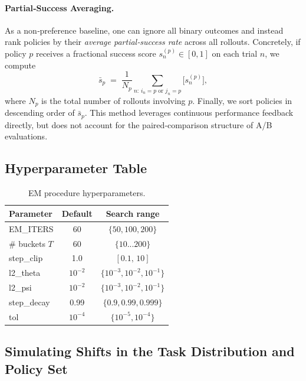 \paragraph{Partial‐Success Averaging.}  
As a non‐preference baseline, one can ignore all binary outcomes and instead rank policies by their \emph{average partial‐success rate} across all rollouts.  Concretely, if policy \(p\) receives a fractional success score \(s_{n}^{(p)}\in[0,1]\) on each trial \(n\), we compute
\[
  \bar s_p \;=\;
    \frac{1}{N_p}\sum_{n:\,i_n=p \text{ or } j_n=p}
      \bigl[s_{n}^{(p)}\bigr],
\]
where \(N_p\) is the total number of rollouts involving \(p\).  Finally, we sort policies in descending order of \(\bar s_p\).  This method leverages continuous performance feedback directly, but does not account for the paired‐comparison structure of A/B evaluations.

\subsection{Hyperparameter Table}

\begin{table}[H]
\centering
\begin{tabular}{lcc}
\toprule
Parameter              & Default           & Search range             \\
\midrule
EM\_ITERS              & 60               & $\{50,100,200\}$         \\
\# buckets $T$         & 60                 & $\{10...200\}$           \\
step\_clip             & 1.0               & $[0.1,\,10]$              \\
l2\_theta              & $10^{-2}$         & $\{10^{-3},10^{-2},10^{-1}\}$ \\
l2\_psi                & $10^{-2}$         & $\{10^{-3},10^{-2},10^{-1}\}$ \\
step\_decay            & 0.99              & $\{0.9,0.99,0.999\}$      \\
tol                    & $10^{-4}$         & $\{10^{-5},10^{-4}\}$     \\
\bottomrule
\end{tabular}
\caption{EM procedure hyperparameters.}
\end{table}

\subsection{Simulating Shifts in the Task Distribution and Policy Set}

